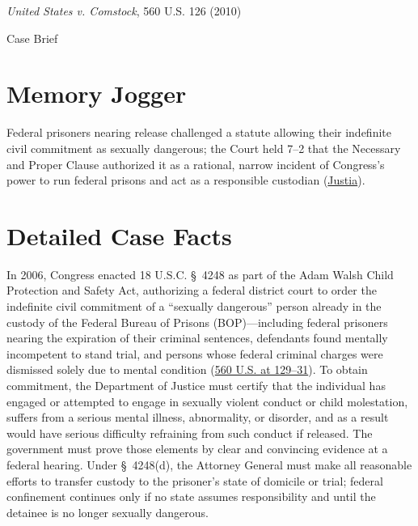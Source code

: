 \documentclass[12pt]{article}
\begin{document}
\begin{center}
{\LARGE \textit{United States v. Comstock}, 560 U.S. 126 (2010)\par}
\vspace{0.8em}
{\large Case Brief\par}
\end{center}
\vspace{1em}

\section{Memory Jogger}
Federal prisoners nearing release challenged a statute allowing their indefinite civil commitment as sexually dangerous; the Court held 7--2 that the Necessary and Proper Clause authorized it as a rational, narrow incident of Congress's power to run federal prisons and act as a responsible custodian (\href{https://supreme.justia.com/cases/federal/us/560/126/}{Justia}).

\section{Detailed Case Facts}
In 2006, Congress enacted 18 U.S.C. \S~4248 as part of the Adam Walsh Child Protection and Safety Act, authorizing a federal district court to order the indefinite civil commitment of a ``sexually dangerous'' person already in the custody of the Federal Bureau of Prisons (BOP)---including federal prisoners nearing the expiration of their criminal sentences, defendants found mentally incompetent to stand trial, and persons whose federal criminal charges were dismissed solely due to mental condition (\href{https://www.law.cornell.edu/supct/html/08-1224.ZO.html}{560 U.S. at 129--31}). To obtain commitment, the Department of Justice must certify that the individual has engaged or attempted to engage in sexually violent conduct or child molestation, suffers from a serious mental illness, abnormality, or disorder, and as a result would have serious difficulty refraining from such conduct if released. The government must prove those elements by clear and convincing evidence at a federal hearing. Under \S~4248(d), the Attorney General must make all reasonable efforts to transfer custody to the prisoner's state of domicile or trial; federal confinement continues only if no state assumes responsibility and until the detainee is no longer sexually dangerous.
\end{document}
